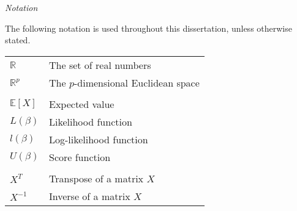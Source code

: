 \thispagestyle{plain}
\begin{center}
    \LARGE{\emph{Notation}}
\end{center}
\vspace{1cm}
The following notation is used throughout this dissertation, unless otherwise stated.
\vspace{1cm}
\begin{center}
	\begin{tabular}{ll}
		$\mathbb{R}$ & The set of real numbers \\
		$\mathbb{R}^p$ & The $p$-dimensional Euclidean space \\
		&\\
		$\mathbb{E}[X]$ & Expected value\\
		$L(\beta)$ & Likelihood function\\
		$l(\beta)$ & Log-likelihood function\\
		$U(\beta)$ & Score function\\
		&\\
		$X^T$ & Transpose of a matrix $X$\\
		$X^{-1}$ & Inverse of a matrix $X$
	\end{tabular}
\end{center}
